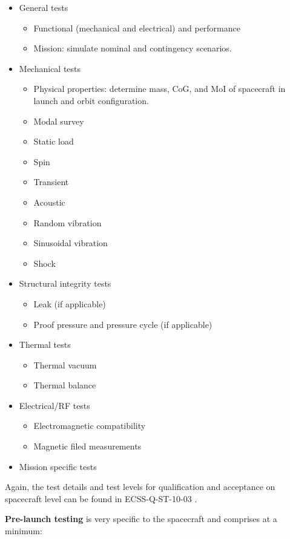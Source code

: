 \begin{itemize}
\item General tests
	\begin{itemize}
	\item Functional (mechanical and electrical) and performance
	\item Mission: simulate nominal and contingency scenarios.
	\end{itemize}
\item Mechanical tests
	\begin{itemize}
	\item Physical properties: determine mass, CoG, and MoI of spacecraft in launch and orbit configuration.
	\item Modal survey
	\item Static load
	\item Spin
	\item Transient
	\item Acoustic
	\item Random vibration
	\item Sinusoidal vibration
	\item Shock
	\end{itemize}
\item Structural integrity tests
	\begin{itemize}
	\item Leak (if applicable)
	\item Proof pressure and pressure cycle (if applicable)
	\end{itemize}
\item Thermal tests
	\begin{itemize}
	\item Thermal vacuum
	\item Thermal balance
	\end{itemize}
\item Electrical/RF tests
	\begin{itemize}
	\item Electromagnetic compatibility
	\item Magnetic filed measurements
	\end{itemize}
\item Mission specific tests
\end{itemize}

Again, the test details and test levels for qualification and acceptance on spacecraft level can be found in ECSS-Q-ST-10-03 \cite{ECSS-E-ST-10-03}.

\textbf{Pre-launch testing} is very specific to the spacecraft and comprises at a minimum:

